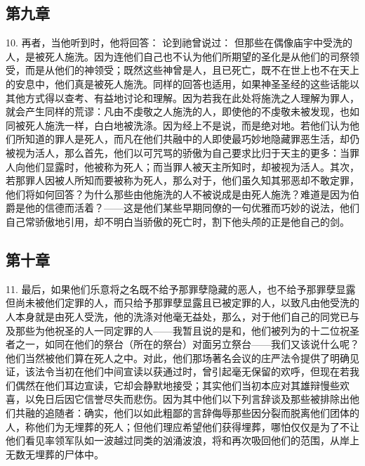 \subsection{第九章}

10. 再者，当他听到时，他将回答： 论到祂曾说过： 但那些在偶像庙宇中受洗的人，是被死人施洗。因为连他们自己也不认为他们所期望的圣化是从他们的司祭领受，而是从他们的神领受；既然这些神曾是人，且已死亡，既不在世上也不在天上的安息中，他们真是被死人施洗。同样的回答也适用，如果神圣圣经的这些话能以其他方式得以查考、有益地讨论和理解。因为若我在此处将施洗之人理解为罪人，就会产生同样的荒谬：凡由不虔敬之人施洗的人，即使他的不虔敬未被发现，也如同被死人施洗一样，白白地被洗涤。因为经上不是说，而是绝对地。若他们认为他们所知道的罪人是死人，而凡在他们共融中的人即使最巧妙地隐藏罪恶生活，却仍被视为活人，那么首先，他们以可咒骂的骄傲为自己要求比归于天主的更多：当罪人向他们显露时，他被称为死人；而当罪人被天主所知时，却被视为活人。其次，若那罪人因被人所知而要被称为死人，那么对于，他们虽久知其邪恶却不敢定罪，他们将如何回答？为什么那些由他施洗的人不被说成是由死人施洗？难道是因为伯爵是他的信德而活着？——这是他们某些早期同僚的一句优雅而巧妙的说法，他们自己常骄傲地引用，却不明白当骄傲的死亡时，割下他头颅的正是他自己的剑。\par


\subsection{第十章}

11. 最后，如果他们乐意将之名既不给予那罪孽隐藏的恶人，也不给予那罪孽显露但尚未被他们定罪的人，而只给予那罪孽显露且已被定罪的人，以致凡由他受洗的人本身就是由死人受洗，他的洗涤对他毫无益处，那么，对于他们自己的同党已与及那些为他祝圣的人一同定罪的人——我暂且说的是和，他们被列为的十二位祝圣者之一，如同在他们的祭台（所在的祭台）对面另立祭台——我们又该说什么呢？他们当然被他们算在死人之中。对此，他们那场著名会议的庄严法令提供了明确见证，该法令当初在他们中间宣读以获通过时，曾引起毫无保留的欢呼，但现在若我们偶然在他们耳边宣读，它却会静默地接受；其实他们当初本应对其雄辩慢些欢喜，以免日后因它信誉尽失而悲伤。因为其中他们以下列言辞谈及那些被排除出他们共融的追随者：确实，他们以如此粗鄙的言辞侮辱那些因分裂而脱离他们团体的人，称他们为无埋葬的死人；但他们理应希望他们获得埋葬，哪怕仅仅是为了不让他们看见率领军队如一波越过同类的汹涌波浪，将和再次吸回他们的范围，从岸上无数无埋葬的尸体中。\par

